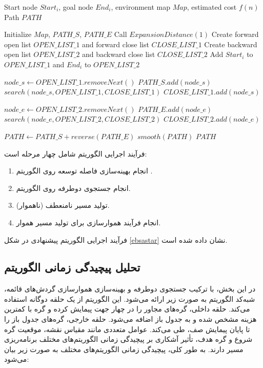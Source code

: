 \begin{latin}
	\begin{algorithm}
		\caption{EBS-A* Algorithm}
		\label{ebs}
		\begin{algorithmic}[1]
			\Require Start node $Start_i$, goal node $End_i$, environment map $Map$, estimated cost $f(n)$
			\Ensure Path $PATH$
			
			\State Initialize $Map$, $PATH\_S$, $PATH\_E$
			\State Call $ExpansionDistance(1)$
			\State Create forward open list $OPEN\_LIST\_1$ and forward close list $CLOSE\_LIST\_1$
			\State Create backward open list $OPEN\_LIST\_2$ and backward close list $CLOSE\_LIST\_2$
			\State Add $Start_i$ to $OPEN\_LIST\_1$ and $End_i$ to $OPEN\_LIST\_2$
			
			\Repeat
			\State $node\_s \gets OPEN\_LIST\_1.removeNext()$
			\State $PATH\_S.add(node\_s)$
			\State $search(node\_s, OPEN\_LIST\_1, CLOSE\_LIST\_1)$
			\State $CLOSE\_LIST\_1.add(node\_s)$
			
			\State $node\_e \gets OPEN\_LIST\_2.removeNext()$
			\State $PATH\_E.add(node\_e)$
			\State $search(node\_e, OPEN\_LIST\_2, CLOSE\_LIST\_2)$
			\State $CLOSE\_LIST\_2.add(node\_e)$
			
			
			\State $PATH \gets PATH\_S + reverse(PATH\_E)$
			\State $smooth(PATH)$
			\State \Return $PATH$
		\end{algorithmic}
	\end{algorithm}
\end{latin}
فرآیند اجرایی الگوریتم  شامل چهار مرحله است: 
\begin{enumerate}
	\item انجام بهینه‌سازی فاصله توسعه روی الگوریتم .
	\item انجام جستجوی دوطرفه روی الگوریتم.
	\item تولید مسیر نامنعطف (ناهموار).
	\item انجام فرآیند هموارسازی برای تولید مسیر هموار.
\end{enumerate}


فرآیند اجرایی الگوریتم پیشنهادی در شکل \ref{ebsastar} نشان داده شده است.

\subsection{تحلیل پیچیدگی زمانی الگوریتم }\label{342}
در این بخش، با ترکیب جستجوی دوطرفه و بهینه‌سازی هموارسازی گردش‌های قائمه، شبه‌کد الگوریتم  به صورت زیر ارائه می‌شود. این الگوریتم از یک حلقه دوگانه استفاده می‌کند. حلقه داخلی، گره‌های مجاور را در چهار جهت پیمایش کرده و گره با کمترین هزینه مشخص شده و به جدول باز اضافه می‌شود. حلقه خارجی، گره‌های جدول باز را تا پایان پیمایش صف، طی می‌کند. عوامل متعددی مانند مقیاس نقشه، موقعیت گره شروع و گره هدف، تأثیر آشکاری بر پیچیدگی زمانی الگوریتم‌های مختلف برنامه‌ریزی مسیر دارند. به طور کلی، پیچیدگی زمانی الگوریتم‌های مختلف به صورت زیر بیان می‌شود:

